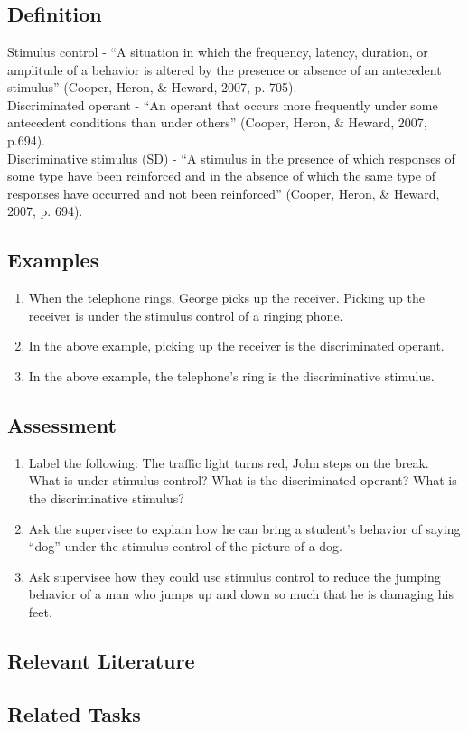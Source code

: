 \clearpage \section{\fourFKTwentyFour{}}
\subsection{Definition}
Stimulus control - ``A situation in which the frequency, latency, duration, or amplitude of a behavior is altered by the presence or absence of an antecedent stimulus'' (Cooper, Heron, \& Heward, 2007, p. 705).\\

Discriminated operant - ``An operant that occurs more frequently under some antecedent conditions than under others'' (Cooper, Heron, \& Heward, 2007, p.694).\\

Discriminative stimulus (SD) - ``A stimulus in the presence of which responses of some type have been reinforced and in the absence of which the same type of responses have occurred and not been reinforced''  (Cooper, Heron, \& Heward, 2007, p. 694).

\subsection{Examples}
\begin{enumerate}
\item When the telephone rings, George picks up the receiver.  Picking up the receiver is under the stimulus control of a ringing phone. 
\item In the above example, picking up the receiver is the discriminated operant. 
\item In the above example, the telephone's ring is the discriminative stimulus.
%
\end{enumerate}
%
\subsection{Assessment}
\begin{enumerate}
\item Label the following:  The traffic light turns red, John steps on the break.  What is under stimulus control? What is the discriminated operant?  What is the discriminative stimulus? 
\item Ask the supervisee to explain how he can bring a student's behavior of saying ``dog'' under the stimulus control of the picture of a dog.
\item Ask supervisee how they could use stimulus control to reduce the jumping behavior of a man who jumps up and down so much that he is damaging his feet.
%
\end{enumerate}
%
\subsection{Relevant Literature}
\begin{refsection}
\nocite{cooper2007applied}
\printbibliography[heading=none]
\end{refsection} 
%
\subsection{Related Tasks}
\fourdNineteen{}\\
\fourFKTwentyTwo{}\\
\fourFKTwentyNine{}\\
